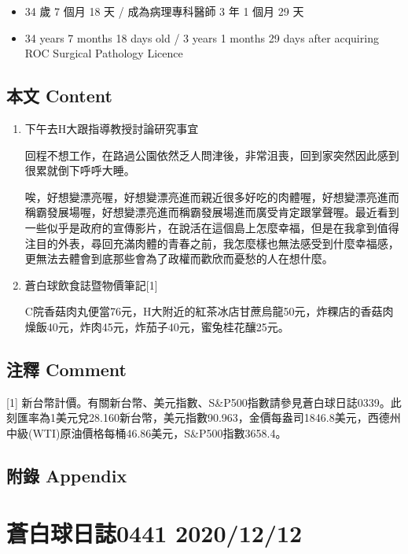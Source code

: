 \documentclass[a5paper, 10pt
]{book}
\providecommand{\tightlist}{%
  \setlength{\itemsep}{0pt}\setlength{\parskip}{0pt}}
\begin{document}
\begin{itemize}
\tightlist
\item
  34 歲 7 個月 18 天 / 成為病理專科醫師 3 年 1 個月 29 天
\item
  34 years 7 months 18 days old / 3 years 1 months 29 days after
  acquiring ROC Surgical Pathology Licence
\end{itemize}

\hypertarget{ux672cux6587-content-10}{%
\subsection{本文 Content}\label{ux672cux6587-content-10}}

\begin{enumerate}
\def\labelenumi{\arabic{enumi}.}
\item
  下午去H大跟指導教授討論研究事宜

  回程不想工作，在路過公園依然乏人問津後，非常沮喪，回到家突然因此感到很累就倒下呼呼大睡。

  唉，好想變漂亮喔，好想變漂亮進而親近很多好吃的肉體喔，好想變漂亮進而稱霸發展場喔，好想變漂亮進而稱霸發展場進而廣受肯定跟掌聲喔。最近看到一些似乎是政府的宣傳影片，在說活在這個島上怎麼幸福，但是在我拿到值得注目的外表，尋回充滿肉體的青春之前，我怎麼樣也無法感受到什麼幸福感，更無法去體會到底那些會為了政權而歡欣而憂愁的人在想什麼。
\item
  蒼白球飲食誌暨物價筆記{[}1{]}

  C院香菇肉丸便當76元，H大附近的紅茶冰店甘蔗烏龍50元，炸粿店的香菇肉燥飯40元，炸肉45元，炸茄子40元，蜜兔桂花釀25元。
\end{enumerate}

\hypertarget{ux6ce8ux91cb-comment-10}{%
\subsection{注釋 Comment}\label{ux6ce8ux91cb-comment-10}}

{[}1{]}
新台幣計價。有關新台幣、美元指數、S\&P500指數請參見蒼白球日誌0339。此刻匯率為1美元兌28.160新台幣，美元指數90.963，金價每盎司1846.8美元，西德州中級(WTI)原油價格每桶46.86美元，S\&P500指數3658.4。

\hypertarget{ux9644ux9304-appendix-10}{%
\subsection{附錄 Appendix}\label{ux9644ux9304-appendix-10}}

\hypertarget{ux84bcux767dux7403ux65e5ux8a8c0441-20201212}{%
\section{蒼白球日誌0441
2020/12/12}\label{ux84bcux767dux7403ux65e5ux8a8c0441-20201212}}
\end{document}
